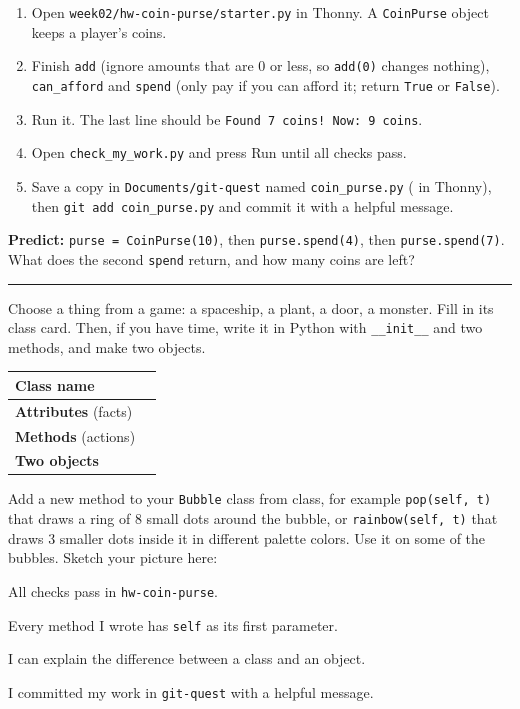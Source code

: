 \namedateline

\begin{core}
\begin{enumerate}[itemsep=2pt]
  \item Open \texttt{week02/hw-coin-purse/starter.py} in Thonny. A \texttt{CoinPurse} object keeps a player's coins.
  \item Finish \texttt{add} (ignore amounts that are 0 or less, so \texttt{add(0)} changes nothing), \texttt{can\_afford} and \texttt{spend} (only pay if you can afford it; return \texttt{True} or \texttt{False}).
  \item Run it. The last line should be \texttt{Found 7 coins! Now: 9 coins}.
  \item Open \texttt{check\_my\_work.py} and press Run until all checks pass.
  \item Save a copy in \texttt{Documents/git-quest} named \texttt{coin\_purse.py} ( in Thonny), then \texttt{git add coin\_purse.py} and commit it with a helpful message.
\end{enumerate}
\textbf{Predict:} \texttt{purse = CoinPurse(10)}, then \texttt{purse.spend(4)}, then \texttt{purse.spend(7)}. What does the second \texttt{spend} return, and how many coins are left? \rule{5cm}{0.4pt}
\end{core}

\begin{challenge}
Choose a thing from a game: a spaceship, a plant, a door, a monster. Fill in its class card. Then, if you have time, write it in Python with \texttt{\_\_init\_\_} and two methods, and make two objects.
\begin{center}
\renewcommand{\arraystretch}{1.7}
\begin{tabular}{|p{4cm}|p{9.5cm}|}
\hline
\textbf{Class name} & \\ \hline
\textbf{Attributes} (facts) & \\ \hline
\textbf{Methods} (actions) & \\ \hline
\textbf{Two objects} & \\ \hline
\end{tabular}
\end{center}
\end{challenge}

\begin{creative}
Add a new method to your \texttt{Bubble} class from class, for example \texttt{pop(self, t)} that draws a ring of 8 small dots around the bubble, or \texttt{rainbow(self, t)} that draws 3 smaller dots inside it in different palette colors. Use it on some of the bubbles. Sketch your picture here:
\answerspace{3cm}
\end{creative}

\begin{selfcheck}
  \item All checks pass in \texttt{hw-coin-purse}.
  \item Every method I wrote has \texttt{self} as its first parameter.
  \item I can explain the difference between a class and an object.
  \item I committed my work in \texttt{git-quest} with a helpful message.
\end{selfcheck}
